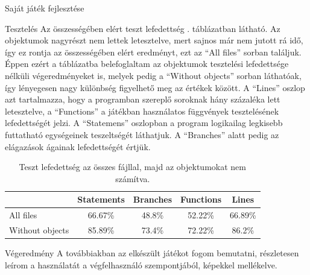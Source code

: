 \begin{MyChapter}{Saját játék fejlesztése}
\begin{MySection}{Tesztelés}
			Az összességében elért teszt lefedettség . táblázatban látható. Az objektumok nagyrészt nem lettek letesztelve, mert sajnos már nem jutott rá idő, így ez rontja az összességében elért eredményt, ezt az ``All files'' sorban találjuk. Éppen ezért a táblázatba belefoglaltam az objektumok tesztelési lefedettsége nélküli végeredményeket is, melyek pedig a ``Without objects'' sorban láthatóak, így lényegesen nagy különbség figyelhető meg az értékek között.
			A ``Lines'' oszlop azt tartalmazza, hogy a programban szereplő soroknak hány százaléka lett letesztelve, a ``Functions'' a játékban használatos függvények tesztelésének lefedettségét jelzi.
			A ``Statemens'' oszlopban a program logikailag legkisebb futtatható egységeinek teszeltségét láthatjuk.
			A ``Branches'' alatt pedig az elágazások ágainak lefedettségét értjük.
			
		\begin{table}[h]
			\centering
			\caption{Teszt lefedettség az összes fájllal, majd az objektumokat nem számítva.}
			\label{tab:teszt_lefedettseg}
			\begin{tabular}{l|c|c|c|c|}
				\cline{2-5}
				& Statements & Branches & Functions & Lines \\ \hline
				\multicolumn{1}{|l|}{All files} & 66.67\% & 48.8\% & 52.22\% & 66.89\% \\ \hline
				\multicolumn{1}{|l|}{Without objects} & 85.89\% & 73.4\% & 72.22\% & 86.2\% \\ \hline
			\end{tabular}
		\end{table}
		
	\end{MySection}

	\begin{MySection}{Végeredmény}
		A továbbiakban az elkészült játékot fogom bemutatni, részletesen leírom a használatát a végfelhasználó szempontjából, képekkel mellékelve.
		

\end{MySection}
\end{MyChapter}
